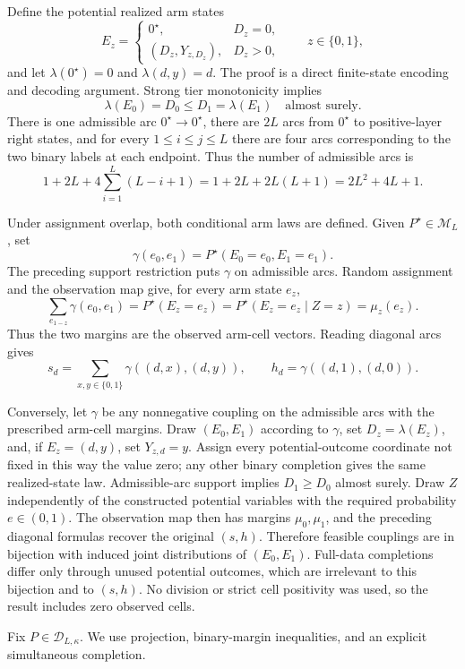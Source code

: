 Define the potential realized arm states
\[
 E_z=
 \begin{cases}
 0^{\star},&D_z=0,\\
 (D_z,Y_{z,D_z}),&D_z>0,
 \end{cases}
 \qquad z\in\{0,1\},
\]
and let \(\lambda(0^{\star})=0\) and \(\lambda(d,y)=d\).  The proof is a direct finite-state encoding and decoding argument.  Strong tier monotonicity implies
\[
 \lambda(E_0)=D_0\le D_1=\lambda(E_1)
 \quad\text{almost surely}.
\]
There is one admissible arc \(0^{\star}\to0^{\star}\), there are \(2L\) arcs from \(0^{\star}\) to positive-layer right states, and for every \(1\le i\le j\le L\) there are four arcs corresponding to the two binary labels at each endpoint.  Thus the number of admissible arcs is
\[
 1+2L+4\sum_{i=1}^{L}(L-i+1)
 =1+2L+2L(L+1)
 =2L^2+4L+1.
\]

Under assignment overlap, both conditional arm laws are defined.  Given \(P^{\star}\in\mathcal M_L\), set
\[
 \gamma(e_0,e_1)=P^{\star}(E_0=e_0,E_1=e_1).
\]
The preceding support restriction puts \(\gamma\) on admissible arcs.  Random assignment and the observation map give, for every arm state \(e_z\),
\[
 \sum_{e_{1-z}}\gamma(e_0,e_1)
 =P^{\star}(E_z=e_z)
 =P^{\star}(E_z=e_z\mid Z=z)
 =\mu_z(e_z).
\]
Thus the two margins are the observed arm-cell vectors.  Reading diagonal arcs gives
\[
 s_d=\sum_{x,y\in\{0,1\}}
 \gamma((d,x),(d,y)),
 \qquad
 h_d=\gamma((d,1),(d,0)).
\]

Conversely, let \(\gamma\) be any nonnegative coupling on the admissible arcs with the prescribed arm-cell margins.  Draw \((E_0,E_1)\) according to \(\gamma\), set \(D_z=\lambda(E_z)\), and, if \(E_z=(d,y)\), set \(Y_{z,d}=y\).  Assign every potential-outcome coordinate not fixed in this way the value zero; any other binary completion gives the same realized-state law.  Admissible-arc support implies \(D_1\ge D_0\) almost surely.  Draw \(Z\) independently of the constructed potential variables with the required probability \(e\in(0,1)\).  The observation map then has margins \(\mu_0,\mu_1\), and the preceding diagonal formulas recover the original \((s,h)\).  Therefore feasible couplings are in bijection with induced joint distributions of \((E_0,E_1)\).  Full-data completions differ only through unused potential outcomes, which are irrelevant to this bijection and to \((s,h)\).  No division or strict cell positivity was used, so the result includes zero observed cells.

Fix \(P\in\mathcal D_{L,\kappa}\).  We use projection, binary-margin inequalities, and an explicit simultaneous completion.

